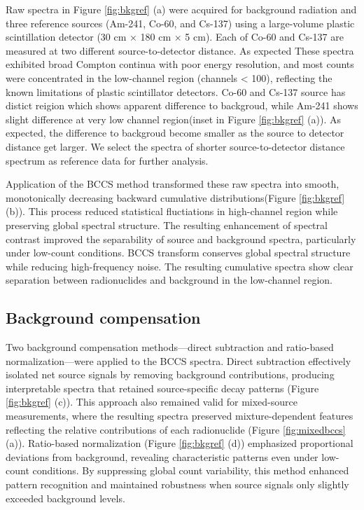 \documentclass[10pt]{wlscirep}
\begin{document}
Raw spectra in Figure \ref{fig:bkgref} (a) were acquired for background radiation and three reference sources (Am-241, Co-60, and Cs-137) using a large-volume plastic scintillation detector (30 cm × 180 cm × 5 cm). Each of Co-60 and Cs-137 are measured at two different source-to-detector distance. As expected These spectra exhibited broad Compton continua with poor energy resolution, and most counts were concentrated in the low-channel region (channels < 100), reflecting the known limitations of plastic scintillator detectors. Co-60 and Cs-137 source has distict reigion which shows apparent difference to backgroud, while Am-241 shows slight difference at very low channel region(inset in Figure \ref{fig:bkgref} (a)). As expected, the difference to backgroud become smaller as the source to detector distance get larger. We select the spectra of shorter source-to-detector distance spectrum as reference data for further analysis.

Application of the BCCS method transformed these raw spectra into smooth, monotonically decreasing backward cumulative distributions(Figure \ref{fig:bkgref} (b)). This process reduced statistical fluctiations in high-channel region while preserving global spectral structure. The resulting enhancement of spectral contrast improved the separability of source and background spectra, particularly under low-count conditions. BCCS transform conserves global spectral structure while reducing high-frequency noise. The resulting cumulative spectra show clear separation between radionuclides and background in the low-channel region.

\subsection*{Background compensation}

Two background compensation methods—direct subtraction and ratio-based normalization—were applied to the BCCS spectra. Direct subtraction effectively isolated net source signals by removing background contributions, producing interpretable spectra that retained source-specific decay patterns (Figure \ref{fig:bkgref} (c)). This approach also remained valid for mixed-source measurements, where the resulting spectra preserved mixture-dependent features reflecting the relative contributions of each radionuclide (Figure \ref{fig:mixedbccs} (a)).
Ratio-based normalization (Figure \ref{fig:bkgref} (d)) emphasized proportional deviations from background, revealing characteristic patterns even under low-count conditions. By suppressing global count variability, this method enhanced pattern recognition and maintained robustness when source signals only slightly exceeded background levels.  
\end{document}
